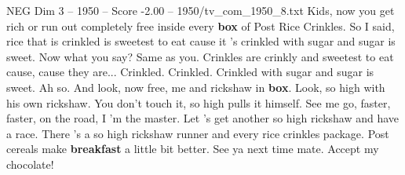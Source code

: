 \begin{textsample}{NEG Dim 3 – 1950 – Score -2.00 – 1950/tv\_com\_1950\_8.txt}  \label{ex:f3_neg_086}
Kids, now you get rich or run out completely free inside every \textbf{box} of Post Rice Crinkles.
So I said, rice that is crinkled is sweetest to eat cause it 's crinkled with sugar and sugar is sweet.
Now what you say?
Same as you.
Crinkles are crinkly and sweetest to eat cause, cause they are...
Crinkled.
Crinkled.
Crinkled with sugar and sugar is sweet.
Ah so.
And look, now free, me and rickshaw in \textbf{box}.
Look, so high with his own rickshaw.
You don't touch it, so high pulls it himself.
See me go, faster, faster, on the road, I 'm the master.
Let 's get another so high rickshaw and have a race.
There 's a so high rickshaw runner and every rice crinkles package.
Post cereals make \textbf{breakfast} a little bit better.
See ya next time mate.
Accept my chocolate!

\end{textsample}
